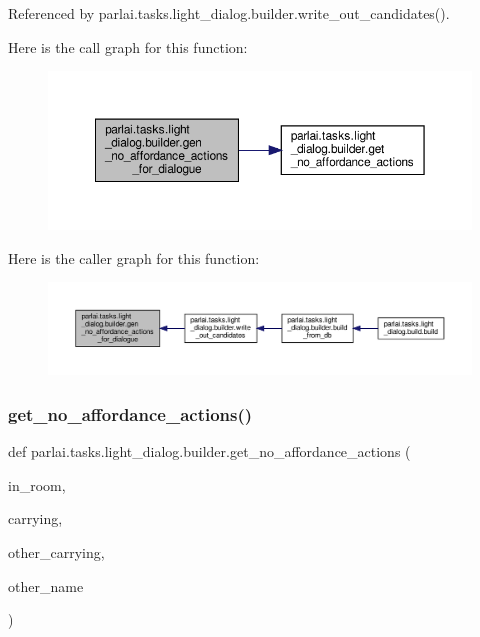 Referenced by parlai.\+tasks.\+light\+\_\+dialog.\+builder.\+write\+\_\+out\+\_\+candidates().

Here is the call graph for this function\+:
\nopagebreak
\begin{figure}[H]
\begin{center}
\leavevmode
\includegraphics[width=350pt]{namespaceparlai_1_1tasks_1_1light__dialog_1_1builder_a537e075c89058b67eb0db786f98491de_cgraph}
\end{center}
\end{figure}
Here is the caller graph for this function\+:
\nopagebreak
\begin{figure}[H]
\begin{center}
\leavevmode
\includegraphics[width=350pt]{namespaceparlai_1_1tasks_1_1light__dialog_1_1builder_a537e075c89058b67eb0db786f98491de_icgraph}
\end{center}
\end{figure}
\mbox{\label{namespaceparlai_1_1tasks_1_1light__dialog_1_1builder_a51921236462b49d240bfde4a648c3ec3}} 
\subsubsection{\texorpdfstring{get\+\_\+no\+\_\+affordance\+\_\+actions()}{get\_no\_affordance\_actions()}}
{\footnotesize\ttfamily def parlai.\+tasks.\+light\+\_\+dialog.\+builder.\+get\+\_\+no\+\_\+affordance\+\_\+actions (\begin{DoxyParamCaption}\item[{}]{in\+\_\+room,  }\item[{}]{carrying,  }\item[{}]{other\+\_\+carrying,  }\item[{}]{other\+\_\+name }\end{DoxyParamCaption})}



